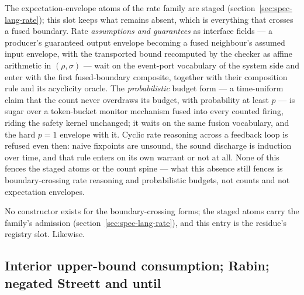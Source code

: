 The expectation-envelope atoms of the rate family are staged
(section~\ref{sec:spec-lang-rate}); this slot keeps what remains
absent, which is everything that crosses a fused boundary. Rate
\emph{assumptions and guarantees} as interface fields --- a
producer's guaranteed output envelope becoming a fused neighbour's
assumed input envelope, with the transported bound recomputed by
the checker as affine arithmetic in $(\rho, \sigma)$ --- wait on
the event-port vocabulary of the system side and enter with the
first fused-boundary composite, together with their composition
rule and its acyclicity oracle. The \emph{probabilistic} budget
form --- a time-uniform claim that the count never overdraws its
budget, with probability at least $p$ --- is sugar over a
token-bucket monitor mechanism fused into every counted firing,
riding the safety kernel unchanged; it waits on the same fusion
vocabulary, and the hard $p = 1$ envelope with it. Cyclic rate
reasoning across a feedback loop is refused even then: naive
fixpoints are unsound, the sound discharge is induction over time,
and that rule enters on its own warrant or not at all. None of
this fences the staged atoms or the count spine --- what this
absence still fences is boundary-crossing rate reasoning and
probabilistic budgets, not counts and not expectation envelopes.

No constructor exists for the boundary-crossing forms; the staged
atoms carry the family's admission
(section~\ref{sec:spec-lang-rate}), and this entry is the
residue's registry slot.
Likewise.

\subsection{Interior upper-bound consumption; Rabin; negated
Streett and until}
\label{sec:spec-lang-fpupper}


